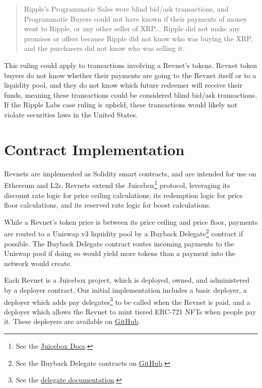 \documentclass{article}
\begin{document}
\begin{quote}
Ripple's Programmatic Sales were blind bid/ask transactions, and Programmatic Buyers could not have known if their payments of money went to Ripple, or any other seller of XRP... Ripple did not make any promises or offers because Ripple did not know who was buying the XRP, and the purchasers did not know who was selling it.
\end{quote}

This ruling could apply to transactions involving a Revnet's tokens. Revnet token buyers do not know whether their payments are going to the Revnet itself or to a liquidity pool, and they do not know which future redeemer will receive their funds, meaning these transactions could be considered blind bid/ask transactions. If the Ripple Labs case ruling is upheld, these transactions would likely not violate securities laws in the United States.

\section{Contract Implementation}

Revnets are implemented as Solidity smart contracts, and are intended for use on Ethereum and L2s. Revnets extend the Juicebox\footnote{See the \href{https://docs.juicebox.money}{Juicebox Docs}.} protocol, leveraging its discount rate logic for price ceiling calculations, its redemption logic for price floor calculations, and its reserved rate logic for boost calculations.

While a Revnet's token price is between its price ceiling and price floor, payments are routed to a Uniswap v3 liquidity pool by a Buyback Delegate\footnote{See the Buyback Delegate contracts on \href{https://github.com/jbx-protocol/juice-buyback}{GitHub}.} contract if possible. The Buyback Delegate contract routes incoming payments to the Uniswap pool if doing so would yield more tokens than a payment into the network would create.

Each Revnet is a Juicebox project, which is deployed, owned, and administered by a deployer contract. Our initial implementation includes a basic deployer, a deployer which adds pay delegates\footnote{See the \href{https://docs.juicebox.money/dev/learn/glossary/delegate/}{delegate documentation}.} to be called when the Revnet is paid, and a deployer which allows the Revnet to mint tiered ERC-721 NFTs when people pay it. These deployers are available on \href{https://github.com/mejango/retailism-templates}{GitHub}.
\end{document}
